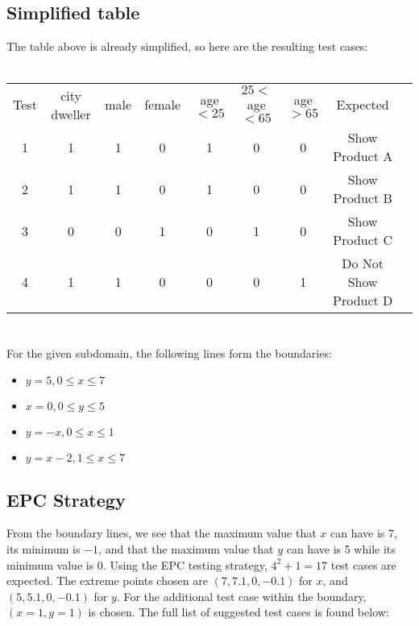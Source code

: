 \documentclass[letterpaper]{article}
\begin{document}
\subsection{Simplified table}
The table above is already simplified, so here are the resulting test cases:
\\ \\
\begin{adjustbox}{center}
	\begin{tabular}{ccccccccc}
		Test & city dweller & male & female & age $<25$ & $25<$ age $<65$ & age $>65$ & Expected              \\ \cline{1-1} \cline{8-8}
		1    & 1            & 1    & 0      & 1         & 0               & 0         & Show Product A        \\
		2    & 1            & 1    & 0      & 1         & 0               & 0         & Show Product B        \\
		3    & 0            & 0    & 1      & 0         & 1               & 0         & Show Product C        \\
		4    & 1            & 1    & 0      & 0         & 0               & 1         & Do Not Show Product D \\
	\end{tabular}
	\end{adjustbox} 

\section{}
For the given subdomain, the following lines form the boundaries:
\begin{itemize}
	\item $y=5, 0\leq x\leq 7$
	\item $x=0, 0\leq y \leq 5$
	\item $y=-x, 0\leq x\leq 1$
	\item $y=x-2, 1\leq x \leq 7$
\end{itemize}

\subsection{EPC Strategy}
From the boundary lines, we see that the maximum value that $x$ can have is
$7$, its minimum is $-1$, and that the maximum value that $y$ can have is
5 while its minimum value is 0. Using the EPC testing strategy,
$4^2 + 1=17$ test cases are expected. The extreme points chosen are
$(7, 7.1, 0, -0.1)$ for $x$, and $(5, 5.1, 0, -0.1)$ for $y$.
For the additional test case within the boundary, $(x=1, y=1)$ is chosen.
The full list of suggested test cases is found below:
\end{document}
